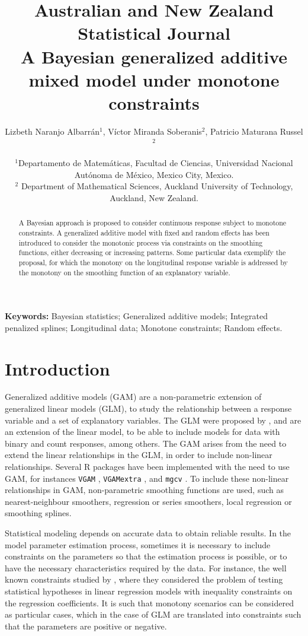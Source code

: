 \documentclass[11pt,letterpaper]{article}
\title{
{\textbf{\large{Australian and New Zealand Statistical Journal}}} \vspace{1cm}\\ 
A Bayesian generalized additive mixed model under monotone constraints 
\vspace{1cm}\\

}
\author{
Lizbeth Naranjo Albarr\'an$^{1}$, V\'ictor Miranda Soberanis$^{2}$,  Patricio Maturana Russel$^{2}$   
}
\date{
$^{1}$Departamento de Matem\'aticas, Facultad de Ciencias, Universidad Nacional Aut\'onoma de M\'exico, Mexico City, Mexico.  \\
$^2$ Department of Mathematical Sciences, Auckland University of Technology, Auckland, New Zealand.  
}
\begin{document}
\maketitle

\begin{abstract}
A Bayesian approach  is proposed to consider continuous response subject to monotone constraints.  A generalized additive model with fixed and random effects has been introduced to consider the monotonic process via constraints on the smoothing functions, either decreasing or increasing patterns. Some particular data exemplify the proposal, for which the monotony on the longitudinal  response variable is addressed by the monotony on the smoothing function of an explanatory variable.   
\end{abstract}

\textbf{Keywords:} 
Bayesian statistics; 
Generalized additive models; 
Integrated penalized splines; 
Longitudinal data; 
Monotone constraints; 
Random effects. 


\section{Introduction}\label{sec:intro}



Generalized additive models (GAM) \citep{HasTib90, Woo17, Yee15} are a non-parametric extension of generalized linear models (GLM), to study the relationship between a response variable and a set of explanatory variables. 
The GLM were proposed by \cite{NelWed72}, and are an extension of the linear model, to be able to include models for data with binary and count responses, among others.   
The GAM arises from the need to extend the linear relationships  in the GLM, in order to include non-linear relationships. 
Several R packages have been implemented with the need to use  GAM, for instances \texttt{VGAM} \citep{Yee10}, \texttt{VGAMextra} \citep{VGAMextra}, and \texttt{mgcv} \citep{Woo17,Woo16}.  
To include these non-linear relationships in GAM, non-parametric smoothing functions are used, such as  nearest-neighbour smoothers, regression or series smoothers, local regression or smoothing splines. 



Statistical modeling depends on accurate data to obtain reliable results. 
In the model parameter estimation process,  sometimes it is necessary to include constraints on the parameters so that the estimation process is possible, or to have the necessary characteristics required by the data. 
For instance, the well known constraints studied by \cite{GouHolMon82}, where they considered the problem of testing statistical hypotheses in linear regression models with inequality constraints on the regression coefficients.    
It is such that monotony scenarios can be considered as particular cases, which in the case of GLM are translated into constraints such that the parameters are positive or negative.
\end{document}
